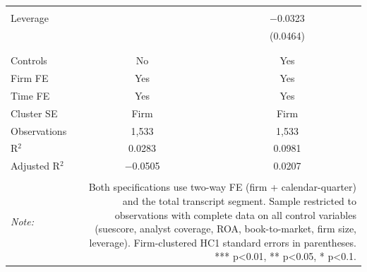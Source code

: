 \begin{table}[!htbp]
\begin{tabular}{@{\extracolsep{5pt}}lcc}
  & & \\ 
 Leverage &  & $-$0.0323 \\ 
  &  & (0.0464) \\ 
  & & \\ 
\hline \\[-1.8ex] 
Controls & No & Yes \\ 
Firm FE & Yes & Yes \\ 
Time FE & Yes & Yes \\ 
Cluster SE & Firm & Firm \\ 
Observations & 1,533 & 1,533 \\ 
R$^{2}$ & 0.0283 & 0.0981 \\ 
Adjusted R$^{2}$ & $-$0.0505 & 0.0207 \\ 
\hline 
\hline \\[-1.8ex] 
\textit{Note:}  & \multicolumn{2}{r}{Both specifications use two-way FE (firm + calendar-quarter) and the total transcript segment. Sample restricted to observations with complete data on all control variables (suescore, analyst coverage, ROA, book-to-market, firm size, leverage). Firm-clustered HC1 standard errors in parentheses. *** p<0.01, ** p<0.05, * p<0.1.} \\ 
\end{tabular} 
\end{table} 

